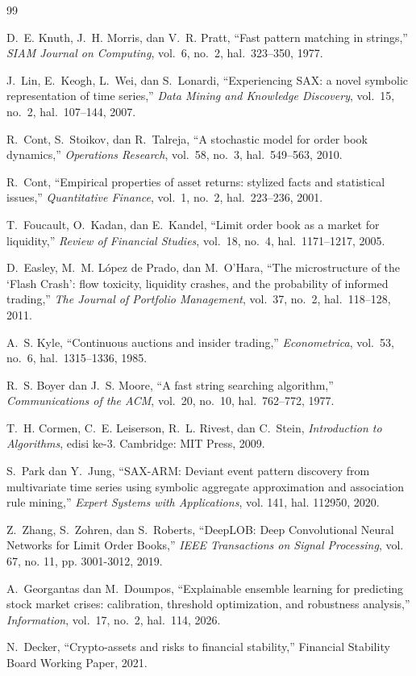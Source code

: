 \documentclass[conference]{IEEEtran}
\begin{document}
\begin{thebibliography}{99}

D.~E. Knuth, J.~H. Morris, dan V.~R. Pratt, ``Fast pattern matching in strings,'' \textit{SIAM Journal on Computing}, vol.~6, no.~2, hal.~323--350, 1977.

J.~Lin, E.~Keogh, L.~Wei, dan S.~Lonardi, ``Experiencing SAX: a novel symbolic representation of time series,'' \textit{Data Mining and Knowledge Discovery}, vol.~15, no.~2, hal.~107--144, 2007.

R.~Cont, S.~Stoikov, dan R.~Talreja, ``A stochastic model for order book dynamics,'' \textit{Operations Research}, vol.~58, no.~3, hal.~549--563, 2010.

R.~Cont, ``Empirical properties of asset returns: stylized facts and statistical issues,'' \textit{Quantitative Finance}, vol.~1, no.~2, hal.~223--236, 2001.

T.~Foucault, O.~Kadan, dan E.~Kandel, ``Limit order book as a market for liquidity,'' \textit{Review of Financial Studies}, vol.~18, no.~4, hal.~1171--1217, 2005.

D.~Easley, M.~M. L\'{o}pez de Prado, dan M.~O'Hara, ``The microstructure of the `Flash Crash': flow toxicity, liquidity crashes, and the probability of informed trading,'' \textit{The Journal of Portfolio Management}, vol.~37, no.~2, hal.~118--128, 2011.

A.~S. Kyle, ``Continuous auctions and insider trading,'' \textit{Econometrica}, vol.~53, no.~6, hal.~1315--1336, 1985.

R.~S. Boyer dan J.~S. Moore, ``A fast string searching algorithm,'' \textit{Communications of the ACM}, vol.~20, no.~10, hal.~762--772, 1977.

T.~H. Cormen, C.~E. Leiserson, R.~L. Rivest, dan C.~Stein, \textit{Introduction to Algorithms}, edisi ke-3. Cambridge: MIT Press, 2009.

S.~Park dan Y.~Jung, ``SAX-ARM: Deviant event pattern discovery from multivariate time series using symbolic aggregate approximation and association rule mining,'' \textit{Expert Systems with Applications}, vol. 141, hal. 112950, 2020.

Z.~Zhang, S.~Zohren, dan S.~Roberts, ``DeepLOB: Deep Convolutional Neural Networks for Limit Order Books,'' \textit{IEEE Transactions on Signal Processing}, vol. 67, no. 11, pp. 3001-3012, 2019.

A.~Georgantas dan M.~Doumpos, ``Explainable ensemble learning for predicting stock market crises: calibration, threshold optimization, and robustness analysis,'' \textit{Information}, vol.~17, no.~2, hal.~114, 2026.

N.~Decker, ``Crypto-assets and risks to financial stability,'' Financial Stability Board Working Paper, 2021.

\end{thebibliography}
\end{document}
